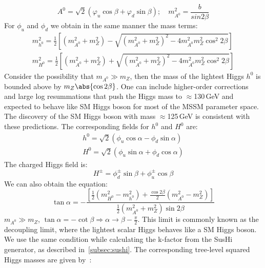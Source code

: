 \begin{equation}
A^{0} = \sqrt{2}\left(\varphi_{u} \cos\beta + \varphi_{d} \sin\beta \right); \quad m^{2}_{A^{0}} = \frac{b}{sin2\beta}
\end{equation}
For $\phi_{u}$ and $\phi_{d}$ we obtain in the same manner the mass terms:
\begin{equation}
\begin{split}
m_{h^{0}}^{2} = \frac{1}{2}\left[ \left(m_{A^{0}}^{2} + m_{Z}^{2} \right) - \sqrt{(m_{A^{0}}^{2} + m_{Z}^{2})^{2} -4m_{A^{0}}^{2}m_{Z}^{2}\cos^{2}2\beta}\right]\\
m_{H^{0}}^{2} = \frac{1}{2}\left[ \left(m_{A^{0}}^{2} + m_{Z}^{2} \right) + \sqrt{(m_{A^{0}}^{2} + m_{Z}^{2})^{2} -4m_{A^{0}}^{2}m_{Z}^{2}\cos^{2}2\beta}\right]
\end{split}\label{higgs_masses_mssm}
\end{equation}
Consider the possibility that $m_{A^{0}} \gg m_{Z}$, then the mass of the lightest Higgs $h^{0}$ is bounded above by $m_{Z}\abs{\cos2\beta}$. One can include higher-order corrections and large log resummations that push the Higgs mass to $\approx$130\,GeV and expected to behave like SM Higgs boson for most of the MSSM parameter space. The discovery of the SM Higgs boson with mass $\approx$125\,GeV is consistent with these predictions. The corresponding fields for $h^{0}$ and $H^{0}$ are:
\begin{equation}
\begin{split}
h^{0} = \sqrt{2}\left(\phi_{u} \cos\alpha - \phi_{d} \sin\alpha \right)\\
H^{0} = \sqrt{2}\left(\phi_{u} \sin\alpha + \phi_{d} \cos\alpha \right)
\end{split}
\end{equation} 
The charged Higgs field is: 
\begin{equation}
H^{\pm} = \phi^{\pm}_{d}\sin\beta + \phi^{\pm}_{u}\cos\beta
\end{equation}
We can also obtain the equation:
\begin{equation}\label{equ:mixing_ang}
\tan\alpha = -\frac{\left[\frac{1}{2}\left(m_{H^{0}}^{2} - m_{h^{0}}^{2}\right)
 + \frac{\cos2\beta}{2}\left(m_{A^{0}}^{2} - m_{Z}^{2}\right) \right]}
 {\frac{1}{2} \left( m_{A^{0}}^{2} + m_{Z}^{2} \right)\sin2\beta}
\end{equation}
$m_{A^{0}} \gg m_{Z}$, $\tan\alpha = -\cot\beta \Rightarrow \alpha\rightarrow \beta - \frac{\pi}{2}$. This limit is commonly known as the decoupling limit, where the lightest scalar Higgs behaves like a SM Higgs boson. We use the same condition while calculating the k-factor from the SusHi generator, as described in~\ref{subsec:sushi}. The corresponding tree-level squared Higgs masses are given by~\cite{Asner:2013psa}:

